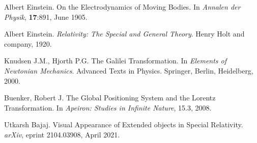 \documentclass{egpubl}
\begin{document}
\begin{thebibliography}{1}
 Albert Einstein.
\newblock On the Electrodynamics of Moving Bodies.
In \emph{Annalen der Physik}, \textbf{17}:891, June 1905.

 Albert Einstein.
\newblock \emph{Relativity: The Special and General Theory}.
Henry Holt and company, 1920.

 Knudsen J.M., Hjorth P.G. The Galilei Transformation.
In \emph{Elements of Newtonian Mechanics}. Advanced Texts in Physics. Springer, Berlin, Heidelberg, 2000.

 Buenker, Robert J.
\newblock The Global Positioning System and the Lorentz Transformation.
In \emph{Apeiron: Studies in Infinite Nature}, 15.3, 2008.

 Utkarsh Bajaj.
\newblock Visual Appearance of Extended objects in Special Relativity.
\emph{arXiv}, eprint 2104.03908, April 2021.

%
%
%
%
%
%

\end{thebibliography}
\end{document}
